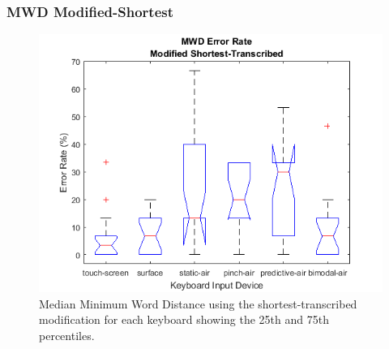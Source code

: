\subsubsection{MWD Modified-Shortest}
\begin{figure}[h]
	\centering
	\includegraphics{fig_MWD_short_boxplot}
	\caption[Minimum Word Distance Boxplot for Modified-Shortest]{Median Minimum Word Distance using the shortest-transcribed modification for each keyboard showing the 25th and 75th percentiles.}
	\label{fig_MWD_short_boxplot}
\end{figure}

